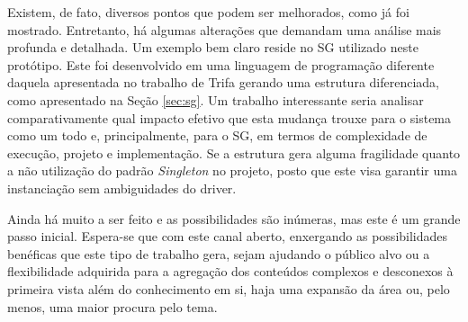 \documentclass[12pt,a4paper,oneside]{report}
\begin{document}
Existem, de fato, diversos pontos que podem ser melhorados, como já foi mostrado. Entretanto, há algumas alterações que demandam uma análise mais profunda e detalhada. Um exemplo bem claro reside no SG utilizado neste protótipo. Este foi desenvolvido em uma linguagem de programação diferente daquela apresentada no trabalho de Trifa\cite{sgtriwiguiboh} gerando uma estrutura diferenciada, como apresentado na Seção \ref{sec:sg}. Um trabalho interessante seria analisar comparativamente qual impacto efetivo que esta mudança trouxe para o sistema como um todo e, principalmente, para o SG, em termos de complexidade de execução, projeto e implementação. Se a estrutura gera alguma fragilidade quanto a não utilização do padrão \emph{Singleton} no projeto, posto que este visa garantir uma instanciação sem ambiguidades do driver.

Ainda há muito a ser feito e as possibilidades são inúmeras, mas este é um grande passo inicial. Espera-se que com este canal aberto, enxergando as possibilidades benéficas que este tipo de trabalho gera, sejam ajudando o público alvo ou a flexibilidade adquirida para a agregação dos conteúdos complexos e desconexos à primeira vista além do conhecimento em si, haja uma expansão da área ou, pelo menos, uma maior procura pelo tema.



\cleardoublepage
{}
\end{document}
